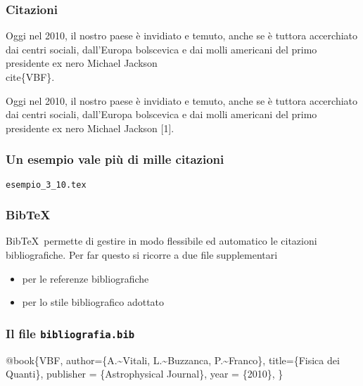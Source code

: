 \documentclass[svgnames,%
	ucs,%
	pdftex]{guitbeamer}
\begin{document}
\begin{frame}
  \frametitle{Citazioni}
	\begin{LaTeXcode}
		Oggi nel 2010, il nostro paese \`e invidiato e temuto, anche se \`e tuttora accerchiato dai centri sociali, dall'Europa bolscevica e dai molli americani del primo presidente ex nero Michael Jackson \alert{\\cite\{VBF\}}.
	\end{LaTeXcode}
	\begin{LaTeXoutput}
		Oggi nel 2010, il nostro paese \`e invidiato e temuto, anche se \`e tuttora accerchiato dai centri sociali, dall'Europa bolscevica e dai molli americani del primo presidente ex nero Michael Jackson [1].
	\end{LaTeXoutput}
\end{frame}
\begin{frame}
  \frametitle{Un esempio vale pi\`u di mille citazioni}
	\begin{center}
		\alert{\texttt{esempio\_3\_10.tex}}
	\end{center}
\end{frame}
\begin{frame}
  \frametitle{Bib\TeX}
	Bib\TeX\ permette di gestire in modo flessibile ed automatico le citazioni bibliografiche. 
	Per far questo si ricorre a due file supplementari
  \bigskip
	\begin{itemize}
		\item {} per le referenze bibliografiche
		\item {} per lo stile bibliografico adottato
	\end{itemize}
\end{frame}
\begin{frame}
  \frametitle{Il file \texttt{bibliografia.bib}}
	\begin{LaTeXcode}
		@book\{\alert{VBF},\n
		\hspace*{5ex} author=\{A.\textasciitilde Vitali, L.\textasciitilde Buzzanca, P.\textasciitilde Franco\},\n
		\hspace*{5ex} title=\{Fisica dei Quanti\},\n
		\hspace*{5ex} publisher = \{Astrophysical Journal\},\n
		\hspace*{5ex} year = \{2010\},\n
		\}
	\end{LaTeXcode}
\end{frame}
\end{document}

